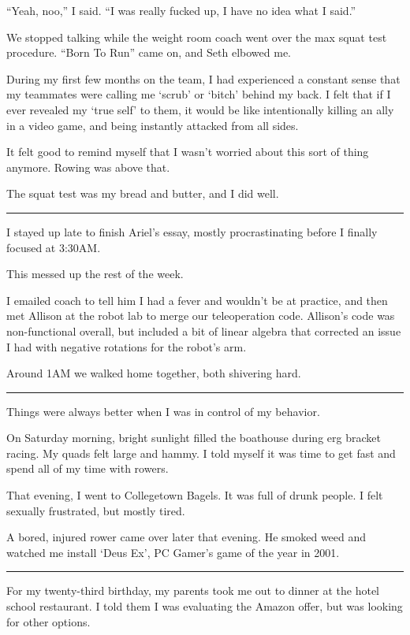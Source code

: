 ``Yeah, noo,'' I said. ``I was really fucked up, I have no idea what I said.''

We stopped talking while the weight room coach went over the max squat test
procedure.  ``Born To Run'' came on, and Seth elbowed me.

During my first few months on the team, I had experienced a constant sense that
my teammates were calling me `scrub' or `bitch' behind my back.  I felt that if
I ever revealed my `true self' to them, it would be like intentionally killing
an ally in a video game, and being instantly attacked from all sides.

It felt good to remind myself that I wasn't worried about this sort of thing
anymore.  Rowing was above that.

The squat test was my bread and butter, and I did well.

\plainfancybreak{12pt}{2}{}

I stayed up late to finish Ariel's essay, mostly procrastinating before I
finally focused at 3:30AM.

This messed up the rest of the week.

I emailed coach to tell him I had a fever and wouldn't be at practice, and then
met Allison at the robot lab to merge our teleoperation code.   Allison's code
was non-functional overall, but included a bit of linear algebra that corrected
an issue I had with negative rotations for the robot's arm.

Around 1AM we walked home together, both shivering hard.

\plainfancybreak{12pt}{2}{}

Things were always better when I was in control of my behavior.

On Saturday morning, bright sunlight filled the boathouse during erg bracket
racing.  My quads felt large and hammy.  I told myself it was time to get fast
and spend all of my time with rowers.

That evening, I went to Collegetown Bagels.  It was full of drunk people.  I
felt sexually frustrated, but mostly tired.

A bored, injured rower came over later that evening.  He smoked weed and watched
me install `Deus Ex', PC Gamer's game of the year in 2001.

\plainfancybreak{12pt}{2}{}

For my twenty-third birthday, my parents took me out to dinner at the hotel
school restaurant.  I told them I was evaluating the Amazon offer, but was
looking for other options.

